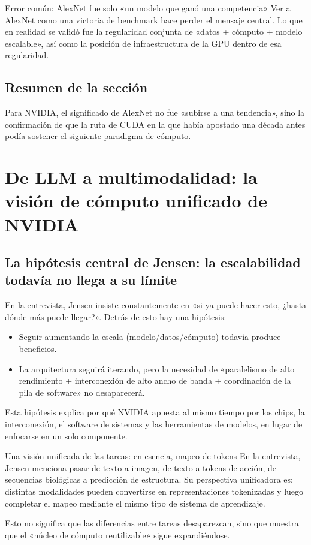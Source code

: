 \documentclass[a4paper]{article}
\begin{document}
\begin{warningbox}{Error común: AlexNet fue solo «un modelo que ganó una competencia»}
Ver a AlexNet como una victoria de benchmark hace perder el mensaje central. Lo que en realidad se validó fue la regularidad conjunta de «datos + cómputo + modelo escalable», así como la posición de infraestructura de la GPU dentro de esa regularidad.
\end{warningbox}

\subsection{Resumen de la sección}
Para NVIDIA, el significado de AlexNet no fue «subirse a una tendencia», sino la confirmación de que la ruta de CUDA en la que había apostado una década antes podía sostener el siguiente paradigma de cómputo.

\section{De LLM a multimodalidad: la visión de cómputo unificado de NVIDIA}

\subsection{La hipótesis central de Jensen: la escalabilidad todavía no llega a su límite}

En la entrevista, Jensen insiste constantemente en «si ya puede hacer esto, ¿hasta dónde más puede llegar?». Detrás de esto hay una hipótesis:
\begin{itemize}
    \item Seguir aumentando la escala (modelo/datos/cómputo) todavía produce beneficios.
    \item La arquitectura seguirá iterando, pero la necesidad de «paralelismo de alto rendimiento + interconexión de alto ancho de banda + coordinación de la pila de software» no desaparecerá.
\end{itemize}

Esta hipótesis explica por qué NVIDIA apuesta al mismo tiempo por los chips, la interconexión, el software de sistemas y las herramientas de modelos, en lugar de enfocarse en un solo componente.

\begin{importantbox}{Una visión unificada de las tareas: en esencia, mapeo de tokens}
En la entrevista, Jensen menciona pasar de texto a imagen, de texto a tokens de acción, de secuencias biológicas a predicción de estructura. Su perspectiva unificadora es: distintas modalidades pueden convertirse en representaciones tokenizadas y luego completar el mapeo mediante el mismo tipo de sistema de aprendizaje.

Esto no significa que las diferencias entre tareas desaparezcan, sino que muestra que el «núcleo de cómputo reutilizable» sigue expandiéndose.
\end{importantbox}
\end{document}

